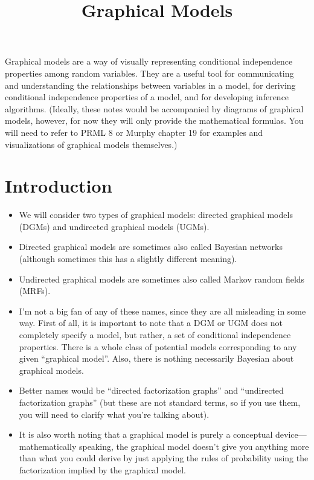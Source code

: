 \documentclass[12pt]{article}
\title{Graphical Models}
\author{}
\date{}
\begin{document}
\maketitle

\tableofcontents


\vspace{2em}

Graphical models are a way of visually representing conditional independence properties among random variables. They are a useful tool for communicating and understanding the relationships between variables in a model, for deriving conditional independence properties of a model, and for developing inference algorithms. (Ideally, these notes would be accompanied by diagrams of graphical models, however, for now they will only provide the mathematical formulas. You will need to refer to PRML 8 or Murphy chapter 19 for examples and visualizations of graphical models themselves.)

\newpage

\section{Introduction}

\begin{itemize}
\item We will consider two types of graphical models: directed graphical models (DGMs) and undirected graphical models (UGMs).
\item Directed graphical models are sometimes also called Bayesian networks (although sometimes this has a slightly different meaning).
\item Undirected graphical models are sometimes also called Markov random fields (MRFs).
\item I'm not a big fan of any of these names, since they are all misleading in some way. First of all, it is important to note that a DGM or UGM does not completely specify a model, but rather, a set of conditional independence properties. There is a whole class of potential models corresponding to any given ``graphical model''. Also, there is nothing necessarily Bayesian about graphical models.
\item Better names would be ``directed factorization graphs'' and ``undirected factorization graphs'' (but these are not standard terms, so if you use them, you will need to clarify what you're talking about).
\item It is also worth noting that a graphical model is purely a conceptual device---mathematically speaking, the graphical model doesn't give you anything more than what you could derive by just applying the rules of probability using the factorization implied by the graphical model.
\end{itemize}
\end{document}
